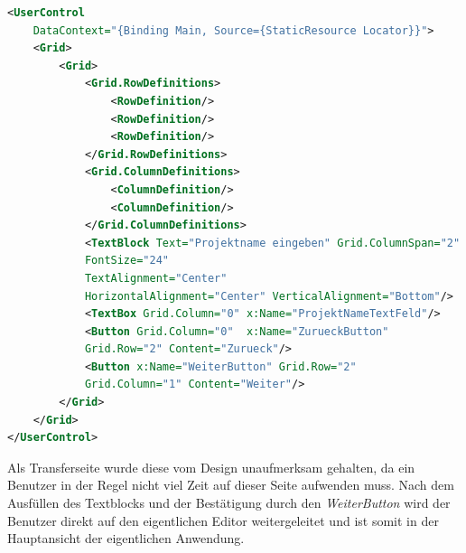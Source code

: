 \begin{lstlisting}[language=XML,
    frame=single,           % Ein Rahmen um den Code
    framexleftmargin=15pt,  % Rahmen link von den Zahlen
    style=algoBericht,
    label={startmenuview},
    captionpos=b,           % Caption unter den Code setzen
caption={Projektname-View XAML-Code}]
<UserControl    
    DataContext="{Binding Main, Source={StaticResource Locator}}">
    <Grid>
        <Grid>
            <Grid.RowDefinitions>
                <RowDefinition/>
                <RowDefinition/>
                <RowDefinition/>
            </Grid.RowDefinitions>
            <Grid.ColumnDefinitions>
                <ColumnDefinition/>
                <ColumnDefinition/>
            </Grid.ColumnDefinitions>
            <TextBlock Text="Projektname eingeben" Grid.ColumnSpan="2" 
            FontSize="24" 
            TextAlignment="Center" 
            HorizontalAlignment="Center" VerticalAlignment="Bottom"/>
            <TextBox Grid.Column="0" x:Name="ProjektNameTextFeld"/>
            <Button Grid.Column="0"  x:Name="ZurueckButton" 
            Grid.Row="2" Content="Zurueck"/>
            <Button x:Name="WeiterButton" Grid.Row="2" 
            Grid.Column="1" Content="Weiter"/>
        </Grid>
    </Grid>
</UserControl>
\end{lstlisting}
Als Transferseite wurde diese vom Design unaufmerksam gehalten, da ein Benutzer in der Regel nicht viel Zeit auf dieser Seite aufwenden muss.
Nach dem Ausfüllen des Textblocks und der Bestätigung durch den \textit{WeiterButton} wird der Benutzer direkt auf den eigentlichen Editor weitergeleitet und ist somit in der 
Hauptansicht der eigentlichen Anwendung. 

